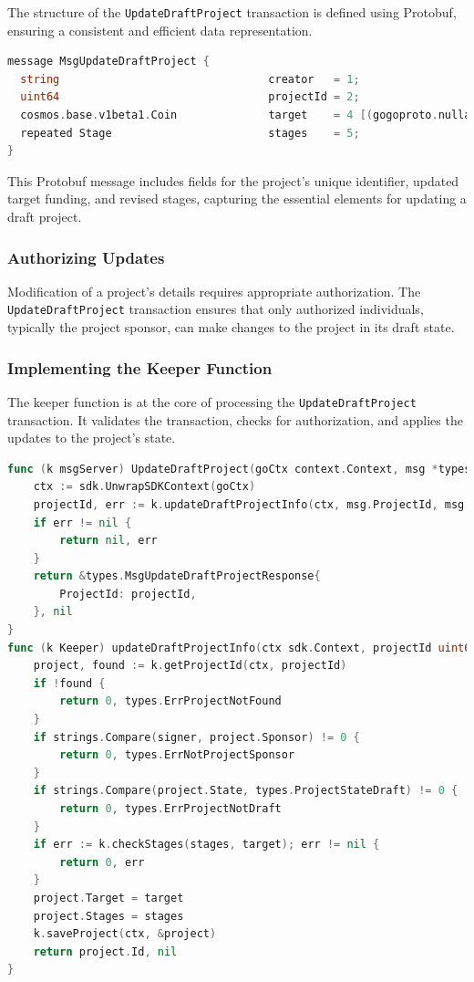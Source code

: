 The structure of the \texttt{UpdateDraftProject} transaction is defined using Protobuf, ensuring a consistent and efficient data representation.

\newpage
\begin{lstlisting}[language=go, caption=UpdateDraftProject protobuf definition, label={lst:update_draft_project_proto}]
message MsgUpdateDraftProject {
  string                                creator   = 1;
  uint64                                projectId = 2;
  cosmos.base.v1beta1.Coin              target    = 4 [(gogoproto.nullable) = false];
  repeated Stage                        stages    = 5;
}
\end{lstlisting}

This Protobuf message includes fields for the project's unique identifier, updated target funding, and revised stages, capturing the essential elements for updating a draft project.

\subsubsection{Authorizing Updates}

Modification of a project's details requires appropriate authorization. The \texttt{UpdateDraftProject} transaction ensures that only authorized individuals, typically the project sponsor, can make changes to the project in its draft state.

\subsubsection{Implementing the Keeper Function}

The keeper function is at the core of processing the \texttt{UpdateDraftProject} transaction. It validates the transaction, checks for authorization, and applies the updates to the project's state.

\begin{lstlisting}[language=go, caption=Keeper implementation for UpdateDraftProject, label={lst:keeper-update-draft}]
func (k msgServer) UpdateDraftProject(goCtx context.Context, msg *types.MsgUpdateDraftProject) (*types.MsgUpdateDraftProjectResponse, error) {
	ctx := sdk.UnwrapSDKContext(goCtx)
	projectId, err := k.updateDraftProjectInfo(ctx, msg.ProjectId, msg.Target, msg.Stages, msg.Creator)
	if err != nil {
		return nil, err
	}
	return &types.MsgUpdateDraftProjectResponse{
		ProjectId: projectId,
	}, nil
}
func (k Keeper) updateDraftProjectInfo(ctx sdk.Context, projectId uint64, target sdk.Coin, stages []*types.Stage, signer string) (uint64, error) {
	project, found := k.getProjectId(ctx, projectId)
	if !found {
		return 0, types.ErrProjectNotFound
	}
	if strings.Compare(signer, project.Sponsor) != 0 {
		return 0, types.ErrNotProjectSponsor
	}
	if strings.Compare(project.State, types.ProjectStateDraft) != 0 {
		return 0, types.ErrProjectNotDraft
	}
	if err := k.checkStages(stages, target); err != nil {
		return 0, err
	}
	project.Target = target
	project.Stages = stages
	k.saveProject(ctx, &project)
	return project.Id, nil
}
\end{lstlisting}

